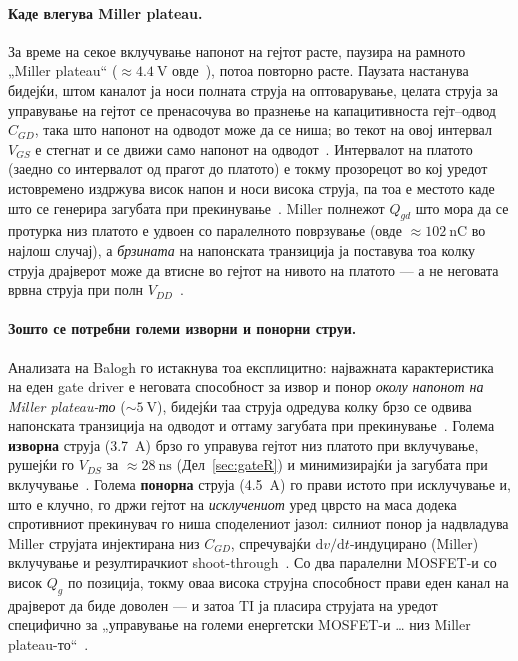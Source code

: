 \documentclass[journal,onecolumn,11pt]{IEEEtran}
\newcommand{\eng}[1]{#1}
\begin{document}
\paragraph{Каде влегува Miller plateau.} За време на секое вклучување напонот на
гејтот расте, паузира на рамното „\eng{Miller plateau}“ ($\approx\SI{4.4}{\volt}$
овде~\cite{ipt015ds}), потоа повторно расте. Паузата настанува бидејќи, штом каналот
ја носи полната струја на оптоварување, целата струја за управување на гејтот се
пренасочува во празнење на капацитивноста гејт--одвод $C_{GD}$, така што напонот на
одводот може да се ниша; во текот на овој интервал $V_{GS}$ е стегнат и се движи
само напонот на одводот~\cite{balogh}. Интервалот на платото (заедно со интервалот
од прагот до платото) е токму прозорецот во кој уредот истовремено издржува висок
напон и носи висока струја, па тоа е местото каде што се генерира загубата при
прекинување~\cite{balogh}. Miller полнежот $Q_{gd}$ што мора да се протурка низ
платото е удвоен со паралелното поврзување (овде $\approx\SI{102}{\nano\coulomb}$ во
најлош случај), а \emph{брзината} на напонската транзиција ја поставува тоа колку
струја драјверот може да втисне во гејтот на нивото на платото --- а не неговата
врвна струја при полн $V_{DD}$~\cite{balogh}.

\paragraph{Зошто се потребни големи изворни и понорни струи.} Анализата на Balogh го
истакнува тоа експлицитно: најважната карактеристика на еден gate driver е неговата
способност за извор и понор \emph{околу напонот на Miller plateau-то}
($\sim\SI{5}{\volt}$), бидејќи таа струја одредува колку брзо се одвива напонската
транзиција на одводот и оттаму загубата при прекинување~\cite{balogh}. Голема
\textbf{изворна} струја (\SI{3.7}{\ampere}) брзо го управува гејтот низ платото при
вклучување, рушејќи го $V_{DS}$ за $\approx\SI{28}{\nano\second}$
(Дел~\ref{sec:gateR}) и минимизирајќи ја загубата при вклучување~\cite{ucc27211,balogh}.
Голема \textbf{понорна} струја (\SI{4.5}{\ampere}) го прави истото при исклучување
и, што е клучно, го држи гејтот на \emph{исклучениот} уред цврсто на маса додека
спротивниот прекинувач го ниша споделениот јазол: силниот понор ја надвладува Miller
струјата инјектирана низ $C_{GD}$, спречувајќи $\mathrm{d}v/\mathrm{d}t$-индуцирано
(Miller) вклучување и резултирачкиот shoot-through~\cite{ucc27211,balogh}. Со два
паралелни MOSFET-и со висок $Q_g$ по позиција, токму оваа висока струјна способност
прави еден канал на драјверот да биде доволен --- и затоа TI ја пласира струјата на
уредот специфично за „управување на големи енергетски MOSFET-и \ldots{} низ Miller
plateau-то“~\cite{ucc27211}.
\end{document}
